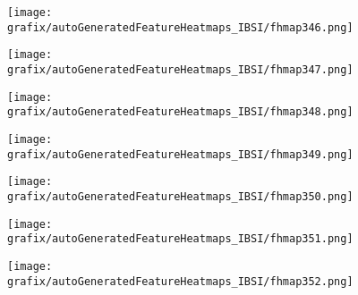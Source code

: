 \hspace{\hsp} 
\begin{subfigure}{\wid\textwidth} 
    \centering 
    \caption{\tiny \sffamily {}} 
    \vspace{\vsp} 
    \texttt{[image: grafix/autoGeneratedFeatureHeatmaps\_IBSI/fhmap346.png]} 
\end{subfigure} 
\hspace{\hsp} 
\begin{subfigure}{\wid\textwidth} 
    \centering 
    \caption{\tiny \sffamily {}} 
    \vspace{\vsp} 
    \texttt{[image: grafix/autoGeneratedFeatureHeatmaps\_IBSI/fhmap347.png]} 
\end{subfigure} 
\hspace{\hsp} 
\begin{subfigure}{\wid\textwidth} 
    \centering 
    \caption{\tiny \sffamily {}} 
    \vspace{\vsp} 
    \texttt{[image: grafix/autoGeneratedFeatureHeatmaps\_IBSI/fhmap348.png]} 
\end{subfigure} 
\hspace{\hsp} 
\begin{subfigure}{\wid\textwidth} 
    \centering 
    \caption{\tiny \sffamily {}} 
    \vspace{\vsp} 
    \texttt{[image: grafix/autoGeneratedFeatureHeatmaps\_IBSI/fhmap349.png]} 
\end{subfigure} 
\hspace{\hsp} 
\begin{subfigure}{\wid\textwidth} 
    \centering 
    \caption{\tiny \sffamily {}} 
    \vspace{\vsp} 
    \texttt{[image: grafix/autoGeneratedFeatureHeatmaps\_IBSI/fhmap350.png]} 
\end{subfigure} 
\hspace{\hsp} 
\begin{subfigure}{\wid\textwidth} 
    \centering 
    \caption{\tiny \sffamily {}} 
    \vspace{\vsp} 
    \texttt{[image: grafix/autoGeneratedFeatureHeatmaps\_IBSI/fhmap351.png]} 
\end{subfigure} 
\hspace{\hsp} 
\begin{subfigure}{\wid\textwidth} 
    \centering 
    \caption{\tiny \sffamily {}} 
    \vspace{\vsp} 
    \texttt{[image: grafix/autoGeneratedFeatureHeatmaps\_IBSI/fhmap352.png]} 
\end{subfigure} 
